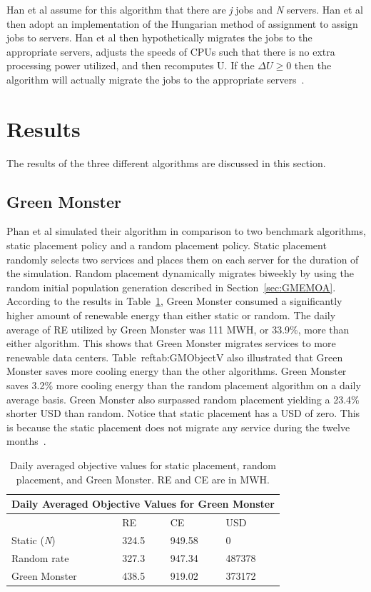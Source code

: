 \documentclass{sig-alternate}
\begin{document}
Han et al assume for this algorithm that there are \emph{j} jobs and \emph{N} servers. Han et al then adopt an implementation of the Hungarian method of assignment to assign jobs to servers. Han et al then hypothetically migrates the jobs to the appropriate servers, adjusts the speeds of CPUs such that there is no extra processing power utilized, and then recomputes U. If the $\Delta U \geq 0$ then the algorithm will actually migrate the jobs to the appropriate servers~\cite{Han}. 

\section{Results} 
\label{sec:results}

The results of the three different algorithms are discussed in this section.

\subsection{Green Monster}
\label{sec:GM}

Phan et al simulated their algorithm in comparison to two benchmark algorithms, static placement policy and a random placement policy. Static placement randomly selects two services and places them on each server for the duration of the simulation. Random placement dynamically migrates biweekly by using the random initial population generation described in Section~\ref{sec:GMEMOA}. According to the results in Table~\ref{tab:GMObjectV}, Green Monster consumed a significantly higher amount of renewable energy than either static or random. The daily average of RE utilized by Green Monster was 111 MWH, or 33.9\%, more than either algorithm. This shows that Green Monster migrates services to more renewable data centers.  Table~ref{tab:GMObjectV} also illustrated that Green Monster saves more cooling energy than the other algorithms. Green Monster saves 3.2\% more cooling energy than the random placement algorithm on a daily average basis. Green Monster also surpassed random placement yielding a 23.4\% shorter USD than random.  Notice that static placement has a USD of zero. This is because the static placement does not migrate any service during the twelve months~\cite{Phan}.   

\begin{table}[tb]
\begin{center}
\begin{tabular}{|l|l|l|l|}
    \hline
    \multicolumn{4}{|c|}{\textbf{Daily Averaged Objective Values for Green Monster}} \\
    \hline
    & RE &  CE & USD \\
    \hline
    Static (\emph{N}) & 324.5 & 949.58 & 0 \\
    Random rate & 327.3 & 947.34 & 487378\\
   	Green Monster & 438.5 & 919.02 & 373172\\
    \hline
\end{tabular}
\caption{Daily averaged objective values for static placement, random placement, and Green Monster. RE and CE are in MWH. }
\label{tab:GMObjectV}
\end{center}
\end{table}
\end{document}
